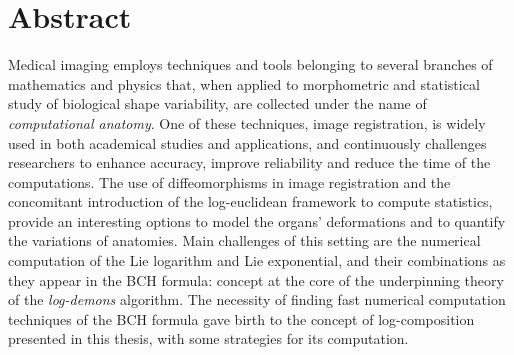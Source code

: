 
\qquad
\pagestyle{empty}
\newpage


\section*{Abstract}

Medical imaging employs techniques and tools belonging to several branches of mathematics and physics that, when applied to morphometric and statistical study of biological shape variability, are collected under the name of \emph{computational anatomy}. 
One of these techniques, image registration, is widely used in both academical studies and applications, and continuously challenges researchers to enhance accuracy, improve reliability and reduce the time of the computations. The use of diffeomorphisms in image registration and the concomitant introduction of the log-euclidean framework to compute statistics, provide an interesting options to model the organs' deformations and to quantify the variations of anatomies.
Main challenges of this setting are the numerical computation of the Lie logarithm and Lie exponential, and their combinations as they appear in the BCH formula: concept at the core of the underpinning theory of the \emph{log-demons} algorithm.
The necessity of finding fast numerical computation techniques of the BCH formula gave birth to the concept of log-composition presented in this thesis, with some strategies for its computation.


